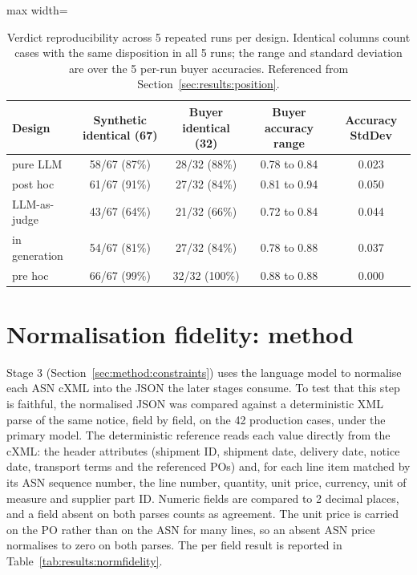\begin{table}[htb]
\centering
\caption{Verdict reproducibility across 5 repeated runs per design. Identical columns count cases with the same disposition in all 5 runs; the range and standard deviation are over the 5 per-run buyer accuracies. Referenced from Section~\ref{sec:results:position}.}
\label{tab:results:repro}
\footnotesize
\begin{adjustbox}{max width=\textwidth}
\begin{tabular}{@{}lcccc@{}}
\toprule
\textbf{Design} & \textbf{Synthetic identical (67)} & \textbf{Buyer identical (32)} & \textbf{Buyer accuracy range} & \textbf{Accuracy StdDev} \\
\midrule
pure LLM      & 58/67 (87\%) & 28/32 (88\%)  & 0.78 to 0.84 & 0.023 \\
post hoc      & 61/67 (91\%) & 27/32 (84\%)  & 0.81 to 0.94 & 0.050 \\
LLM-as-judge  & 43/67 (64\%) & 21/32 (66\%)  & 0.72 to 0.84 & 0.044 \\
in generation & 54/67 (81\%) & 27/32 (84\%)  & 0.78 to 0.88 & 0.037 \\
pre hoc       & 66/67 (99\%) & 32/32 (100\%) & 0.88 to 0.88 & 0.000 \\
\bottomrule
\end{tabular}
\end{adjustbox}
\end{table}

\chapter{Normalisation fidelity: method} \label{app:normfidelity}

Stage 3 (Section~\ref{sec:method:constraints}) uses the language model to normalise each ASN cXML into the JSON the later stages consume. To test that this step is faithful, the normalised JSON was compared against a deterministic XML parse of the same notice, field by field, on the 42 production cases, under the primary model. The deterministic reference reads each value directly from the cXML: the header attributes (shipment ID, shipment date, delivery date, notice date, transport terms and the referenced POs) and, for each line item matched by its ASN sequence number, the line number, quantity, unit price, currency, unit of measure and supplier part ID. Numeric fields are compared to 2 decimal places, and a field absent on both parses counts as agreement. The unit price is carried on the PO rather than on the ASN for many lines, so an absent ASN price normalises to zero on both parses. The per field result is reported in Table~\ref{tab:results:normfidelity}.

